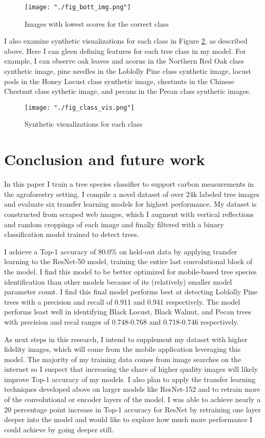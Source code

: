 \documentclass[10pt,twocolumn,letterpaper]{article}
\begin{document}
\begin{figure}[!htbp]
  \centering
  \texttt{[image: "./fig\_bott\_img.png"]}
  \caption{\label{fig:bott_imgs} Images with lowest scores for the correct class}
\end{figure}

I also examine synthetic visualizations for each class in Figure \ref{fig:class_vis}, as described above. Here I can gleen defining features for each tree class in my model. For example, I can observe oak leaves and acorns in the Northern Red Oak class synthetic image, pine needles in the Loblolly Pine class synthetic image, locust pods in the Honey Locust class synthetic image, chestnuts in the Chinese Chestnut class sythetic image, and pecans in the Pecan class synthetic images.

\begin{figure}[!htbp]
  \centering
  \texttt{[image: "./fig\_class\_vis.png"]}
  \caption{\label{fig:class_vis} Synthetic visualizations for each class}
\end{figure}


\section{Conclusion and future work}
\label{sec:conclusion}
In this paper I train a tree species classifier to support carbon measurements in the agroforestry setting. I compile a novel dataset of over 24k labeled tree images and evaluate six transfer learning models for highest performance. My dataset is constructed from scraped web images, which I augment with vertical reflections and random croppings of each image and finally filtered with a binary classification model trained to detect trees.
  
I achieve a Top-1 accuracy of 80.0\% on held-out data by applying transfer learning to the ResNet-50 model, training the entire last convolutional block of the model. I find this model to be better optimized for mobile-based tree species identification than other models because of its (relatively) smaller model parameter count. I find this final model performs best at detecting Loblolly Pine trees with a precision and recall of 0.911 and 0.941 respectively. The model performs least well in identifying Black Locust, Black Walnut, and Pecan trees with precision and recal ranges of 0.748-0.768 and 0.718-0.746 respectively.

As next steps in this research, I intend to supplement my dataset with higher fidelity images, which will come from the mobile application leveraging this model. The majority of my training data comes from image searches on the internet so I suspect that increasing the share of higher quality images will likely improve Top-1 accuracy of my models. I also plan to apply the transfer learning techniques developed above on larger models like ResNet-152 and to retrain more of the convolutional or encoder layers of the model. I was able to achieve nearly a 20 percentage point increase in Top-1 accuracy for ResNet by retraining one layer deeper into the model and would like to explore how much more performance I could achieve by going deeper still. 
\end{document}
